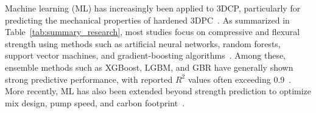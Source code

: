 \documentclass[review, authoryear, 12pt]{elsarticle}
\begin{document}
Machine learning (ML) has increasingly been applied to 3DCP, particularly for predicting the mechanical properties of hardened 3DPC~\citep{ali_machine_2023}. As summarized in Table~\ref{tab:summary_research}, most studies focus on compressive and flexural strength using methods such as artificial neural networks, random forests, support vector machines, and gradient-boosting algorithms~\citep{izadgoshasb_predicting_2021, ghasemi_tailoring_2023, uddin_novel_2024, zhu_eco-friendly_2024, zhang_research_2025, khodadadi_machine_2025}. Among these, ensemble methods such as XGBoost, LGBM, and GBR have generally shown strong predictive performance, with reported $R^2$ values often exceeding 0.9~\citep{ghasemi_tailoring_2023, uddin_novel_2024}. More recently, ML has also been extended beyond strength prediction to optimize mix design, pump speed, and carbon footprint~\citep{schossler_data-driven_2025}.
\end{document}
